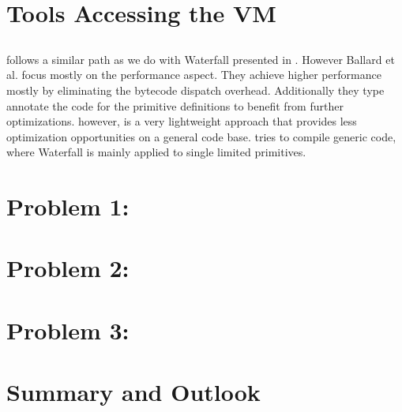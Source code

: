 \section{Tools Accessing the VM}

\subsection*{\Quicktalk}
\Quicktalk \cite{Ball86a} follows a similar path as we do with Waterfall presented in .
However Ballard et al. focus mostly on the performance aspect.
They achieve higher performance mostly by eliminating the bytecode dispatch overhead.
Additionally they type annotate the code for the primitive definitions to benefit from further optimizations.
\WF however, is a very lightweight approach that provides less optimization opportunities on a general code base.
\Quicktalk tries to compile generic \ST code, where Waterfall is mainly applied to single limited primitives.


\subsection*{\DTrace}


\section{Problem 1: }


\section{Problem 2: }


\section{Problem 3: }


\section{Summary and Outlook}

 \\


